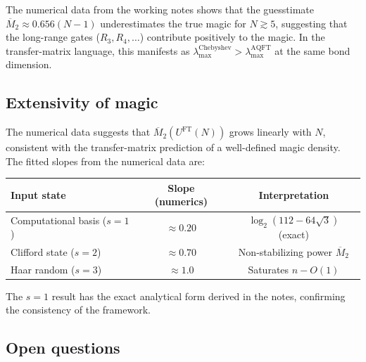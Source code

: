 \documentclass[11pt,a4paper]{article}
\theoremstyle{definition}
\theoremstyle{remark}
\newcommand{\Mtwo}{\overline{M}_2}
\newcommand{\UFT}{U^{\mathrm{FT}}}
\newcommand{\AQFT}{\mathrm{AQFT}}
\begin{document}
The numerical data from the working notes shows that the guesstimate $\Mtwo \approx 0.656(N-1)$ underestimates the true magic for $N\gtrsim 5$, suggesting that the long-range gates ($R_3, R_4, \ldots$) contribute positively to the magic.  In the transfer-matrix language, this manifests as $\lambda_{\max}^{\mathrm{Chebyshev}} > \lambda_{\max}^{\AQFT}$ at the same bond dimension.

\subsection{Extensivity of magic}

The numerical data suggests that $\Mtwo(\UFT(N))$ grows linearly with $N$, consistent with the transfer-matrix prediction of a well-defined magic density.  The fitted slopes from the numerical data are:
\begin{center}
\renewcommand{\arraystretch}{1.3}
\begin{tabular}{lcc}
  \toprule
  Input state & Slope (numerics) & Interpretation \\
  \midrule
  Computational basis ($s=1$) & $\approx 0.20$ & $\log_2(112-64\sqrt{3})$ (exact) \\
  Clifford state ($s=2$) & $\approx 0.70$ & Non-stabilizing power $\Mtwo$ \\
  Haar random ($s=3$) & $\approx 1.0$ & Saturates $n-O(1)$ \\
  \bottomrule
\end{tabular}
\end{center}
The $s=1$ result has the exact analytical form derived in the notes, confirming the consistency of the framework.

\subsection{Open questions}
\end{document}
